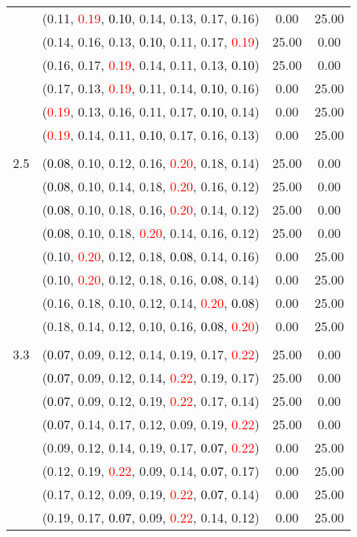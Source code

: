 \documentclass[10pt,a4paper]{report}
\begin{document}
\begin{center}
\begin{longtable}{clcc}
			&(0.11, \textcolor{red}{0.19}, \textcolor{black}{0.10}, 0.14, 0.13, 0.17, 0.16)&0.00&25.00\\
			&(0.14, 0.16, 0.13, \textcolor{black}{0.10}, 0.11, 0.17, \textcolor{red}{0.19})&25.00&0.00\\
			&(0.16, 0.17, \textcolor{red}{0.19}, 0.14, 0.11, 0.13, \textcolor{black}{0.10})&25.00&0.00\\
			&(0.17, 0.13, \textcolor{red}{0.19}, 0.11, 0.14, \textcolor{black}{0.10}, 0.16)&0.00&25.00\\
			&(\textcolor{red}{0.19}, 0.13, 0.16, 0.11, 0.17, \textcolor{black}{0.10}, 0.14)&0.00&25.00\\
			&(\textcolor{red}{0.19}, 0.14, 0.11, \textcolor{black}{0.10}, 0.17, 0.16, 0.13)&0.00&25.00\\
		&&&\\
		2.5			&(\textcolor{black}{0.08}, 0.10, 0.12, 0.16, \textcolor{red}{0.20}, 0.18, 0.14)&25.00&0.00\\
			&(\textcolor{black}{0.08}, 0.10, 0.14, 0.18, \textcolor{red}{0.20}, 0.16, 0.12)&25.00&0.00\\
			&(\textcolor{black}{0.08}, 0.10, 0.18, 0.16, \textcolor{red}{0.20}, 0.14, 0.12)&25.00&0.00\\
			&(\textcolor{black}{0.08}, 0.10, 0.18, \textcolor{red}{0.20}, 0.14, 0.16, 0.12)&25.00&0.00\\
			&(0.10, \textcolor{red}{0.20}, 0.12, 0.18, \textcolor{black}{0.08}, 0.14, 0.16)&0.00&25.00\\
			&(0.10, \textcolor{red}{0.20}, 0.12, 0.18, 0.16, \textcolor{black}{0.08}, 0.14)&0.00&25.00\\
			&(0.16, 0.18, 0.10, 0.12, 0.14, \textcolor{red}{0.20}, \textcolor{black}{0.08})&0.00&25.00\\
			&(0.18, 0.14, 0.12, 0.10, 0.16, \textcolor{black}{0.08}, \textcolor{red}{0.20})&0.00&25.00\\
		&&&\\
		3.3			&(\textcolor{black}{0.07}, 0.09, 0.12, 0.14, 0.19, 0.17, \textcolor{red}{0.22})&25.00&0.00\\
			&(\textcolor{black}{0.07}, 0.09, 0.12, 0.14, \textcolor{red}{0.22}, 0.19, 0.17)&25.00&0.00\\
			&(\textcolor{black}{0.07}, 0.09, 0.12, 0.19, \textcolor{red}{0.22}, 0.17, 0.14)&25.00&0.00\\
			&(\textcolor{black}{0.07}, 0.14, 0.17, 0.12, 0.09, 0.19, \textcolor{red}{0.22})&25.00&0.00\\
			&(0.09, 0.12, 0.14, 0.19, 0.17, \textcolor{black}{0.07}, \textcolor{red}{0.22})&0.00&25.00\\
			&(0.12, 0.19, \textcolor{red}{0.22}, 0.09, 0.14, \textcolor{black}{0.07}, 0.17)&0.00&25.00\\
			&(0.17, 0.12, 0.09, 0.19, \textcolor{red}{0.22}, \textcolor{black}{0.07}, 0.14)&0.00&25.00\\
			&(0.19, 0.17, \textcolor{black}{0.07}, 0.09, \textcolor{red}{0.22}, 0.14, 0.12)&0.00&25.00\\
		\bottomrule
	\end{longtable}
\end{center}
\end{document}
